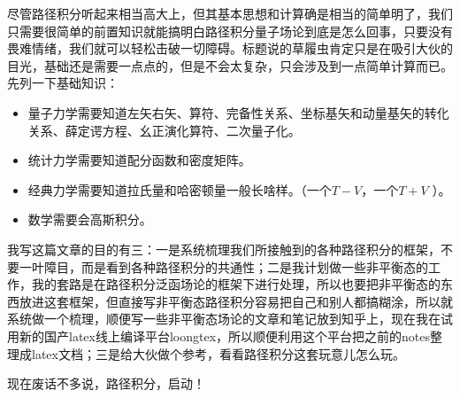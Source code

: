\documentclass[12pt, a4paper, oneside]{ctexart}
\begin{document}
尽管路径积分听起来相当高大上，但其基本思想和计算确是相当的简单明了，我们只需要很简单的前置知识就能搞明白路径积分量子场论到底是怎么回事，只要没有畏难情绪，我们就可以轻松击破一切障碍。标题说的草履虫肯定只是在吸引大伙的目光，基础还是需要一点点的，但是不会太复杂，只会涉及到一点简单计算而已。先列一下基础知识：
\begin{itemize}
    \item 量子力学需要知道左矢右矢、算符、完备性关系、坐标基矢和动量基矢的转化关系、薛定谔方程、幺正演化算符、二次量子化。
    \item 统计力学需要知道配分函数和密度矩阵。
    \item 经典力学需要知道拉氏量和哈密顿量一般长啥样。（一个$T-V$，一个$T+V$ ）。
    \item 数学需要会高斯积分。
\end{itemize}



我写这篇文章的目的有三：一是系统梳理我们所接触到的各种路径积分的框架，不要一叶障目，而是看到各种路径积分的共通性；二是我计划做一些非平衡态的工作，我的套路是在路径积分泛函场论的框架下进行处理，所以也要把非平衡态的东西放进这套框架，但直接写非平衡态路径积分容易把自己和别人都搞糊涂，所以就系统做一个梳理，顺便写一些非平衡态场论的文章和笔记放到知乎上，现在我在试用新的国产latex线上编译平台loongtex，所以顺便利用这个平台把之前的notes整理成latex文档；三是给大伙做个参考，看看路径积分这套玩意儿怎么玩。

现在废话不多说，路径积分，启动！
\end{document}
